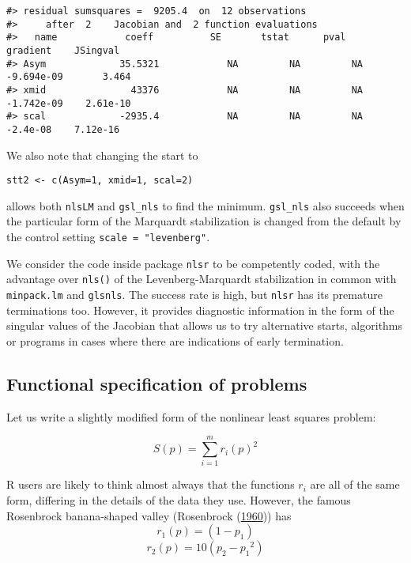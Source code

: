 \begin{verbatim}
#> residual sumsquares =  9205.4  on  12 observations
#>     after  2    Jacobian and  2 function evaluations
#>   name            coeff          SE       tstat      pval      gradient    JSingval   
#> Asym             35.5321            NA         NA         NA  -9.694e-09       3.464  
#> xmid               43376            NA         NA         NA  -1.742e-09    2.61e-10  
#> scal             -2935.4            NA         NA         NA    -2.4e-08    7.12e-16
\end{verbatim}

We also
note that changing the start to

\begin{verbatim}
stt2 <- c(Asym=1, xmid=1, scal=2)
\end{verbatim}

allows both \texttt{nlsLM} and \texttt{gsl\_nls} to find the minimum. \texttt{gsl\_nls} also succeeds
when the particular form of the Marquardt stabilization is changed from the
default by the control setting \texttt{scale\ =\ "levenberg"}.

We consider the code inside package \texttt{nlsr} to be competently coded,
with the advantage over \texttt{nls()} of the Levenberg-Marquardt stabilization
in common with \texttt{minpack.lm} and \texttt{glsnls}. The success rate is high,
but \texttt{nlsr} has its premature terminations too. However, it provides
diagnostic information in the form of the singular values of the Jacobian
that allows us to try alternative starts, algorithms or programs in cases
where there are indications of early termination.

\hypertarget{functional-specification-of-problems}{%
\subsection{Functional specification of problems}\label{functional-specification-of-problems}}

Let us write a slightly modified form of the nonlinear least squares problem:

\[ S(p) = \sum_{i=1}^m { r_i(p)^2 }\]

R users are likely to think almost always that the functions \(r_i\) are all of
the same form, differing in the details of the data they use. However, the
famous Rosenbrock banana-shaped valley (Rosenbrock (\protect\hyperlink{ref-Rosenbrock1960}{1960})) has
\[ r_1(p) = (1 - p_1)\]
\[ r_2(p) = 10 (p_2 - {p_1}^2)\]

